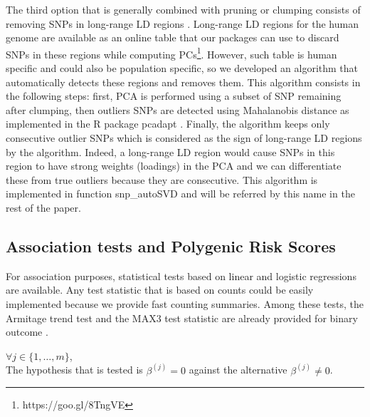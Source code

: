 \documentclass{bioinfo}
\begin{document}
The third option that is generally combined with pruning or clumping consists of removing SNPs in long-range LD regions \cite[]{Price2008}. Long-range LD regions for the human genome are available as an online table that our packages can use to discard SNPs in these regions while computing PCs\footnote{https://goo.gl/8TngVE}. However, such table is human specific and could also be population specific, so we developed an algorithm that automatically detects these regions and removes them. This algorithm consists in the following steps: first, PCA is performed using a subset of SNP remaining after clumping, then outliers SNPs are detected using Mahalanobis distance as implemented in the R package pcadapt \cite[]{Luu2017}. Finally, the algorithm keeps only consecutive outlier SNPs which is considered as the sign of long-range LD regions by the algorithm. Indeed, a long-range LD region would cause SNPs in this region to have strong weights (loadings) in the PCA and we can differentiate these from true outliers because they are consecutive. This algorithm is implemented in function snp\_autoSVD and will be referred by this name in the rest of the paper.


\subsection{Association tests and Polygenic Risk Scores}

For association purposes, statistical tests based on linear and logistic regressions are available. Any test statistic that is based on counts could be easily implemented because we provide fast counting summaries. Among these tests, the Armitage trend test and the MAX3 test statistic are already provided for binary outcome \cite[]{Zheng2012}. 

$\forall j \in \{1, \dots, m\}$, 
\\
The hypothesis that is tested is $\beta^{(j)} = 0$ against the alternative $\beta^{(j)} \neq 0$.
\end{document}
